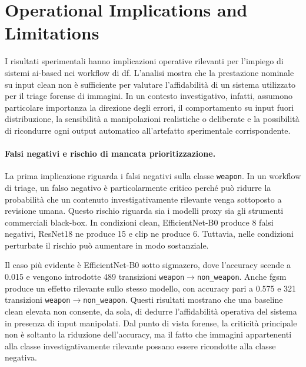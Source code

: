 \section{Operational Implications and Limitations}
\label{sec:results-implications}

I risultati sperimentali hanno implicazioni operative rilevanti per l'impiego di
sistemi \gls{ai}-based nei workflow di \gls{df}. L'analisi mostra che la
prestazione nominale su input clean non è sufficiente per valutare
l'affidabilità di un sistema utilizzato per il triage forense di immagini. In un
contesto investigativo, infatti, assumono particolare importanza la direzione
degli errori, il comportamento su input fuori distribuzione, la sensibilità a
manipolazioni realistiche o deliberate e la possibilità di ricondurre ogni output
automatico all'artefatto sperimentale corrispondente.

\paragraph{Falsi negativi e rischio di mancata prioritizzazione.}

La prima implicazione riguarda i falsi negativi sulla classe
\texttt{weapon}. In un workflow di triage, un falso negativo è particolarmente
critico perché può ridurre la probabilità che un contenuto investigativamente
rilevante venga sottoposto a revisione umana. Questo rischio riguarda sia i
modelli proxy sia gli strumenti commerciali black-box. In condizioni clean,
EfficientNet-B0 produce 8 falsi negativi, ResNet18 ne produce 15 e \gls{clip}
ne produce 6. Tuttavia, nelle condizioni perturbate il rischio può aumentare in
modo sostanziale.

Il caso più evidente è EfficientNet-B0 sotto \gls{sigmazero}, dove l'accuracy
scende a 0.015 e vengono introdotte 489 transizioni
\texttt{weapon}\(\rightarrow\)\texttt{non\_weapon}. Anche \gls{fgsm} produce un
effetto rilevante sullo stesso modello, con accuracy pari a 0.575 e 321
transizioni \texttt{weapon}\(\rightarrow\)\texttt{non\_weapon}. Questi risultati
mostrano che una baseline clean elevata non consente, da sola, di dedurre
l'affidabilità operativa del sistema in presenza di input manipolati. Dal punto
di vista forense, la criticità principale non è soltanto la riduzione
dell'accuracy, ma il fatto che immagini appartenenti alla classe
investigativamente rilevante possano essere ricondotte alla classe negativa.

